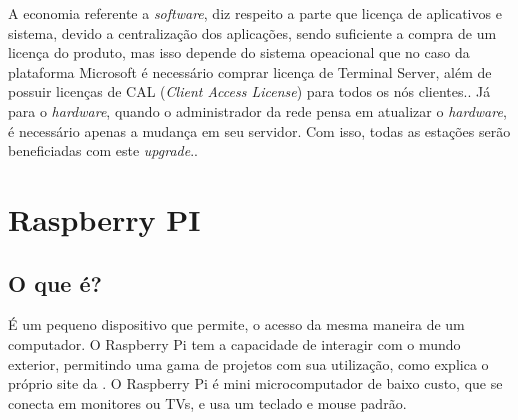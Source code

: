 \documentclass[
	12pt,				%
	openright,			%
	twoside,			%
	a4paper,			%
	chapter=TITLE,		%
	english,			%
	brazil				%
	]{abntex2}
\begin{document}
A economia referente a \textit{software}, diz respeito a parte que licença de aplicativos e sistema, devido a centralização dos aplicações, sendo suficiente a compra de um licença do produto, mas isso depende do sistema opeacional que no caso da plataforma Microsoft é necessário comprar licença de Terminal Server, além de possuir licenças de CAL (\textit{Client Access License}) para todos os nós clientes.\cite{microsoft}. Já para o \textit{hardware}, quando o administrador da rede pensa em atualizar o \textit{hardware}, é necessário apenas a mudança em seu servidor. Com isso, todas as estações serão beneficiadas com este \textit{upgrade}.\cite{EmailThinClient}.


\begin{table}[h!]
\end{table}

\newpage



\chapter{Raspberry PI}


\section{O que é?}


É um pequeno dispositivo que permite, o acesso da mesma maneira de um computador. O Raspberry Pi tem a capacidade de interagir com o mundo exterior, permitindo uma gama de projetos com sua utilização, como explica o próprio site da . O Raspberry Pi é mini microcomputador de baixo custo, que se conecta em monitores ou TVs, e usa um teclado e mouse padrão. 
\end{document}
